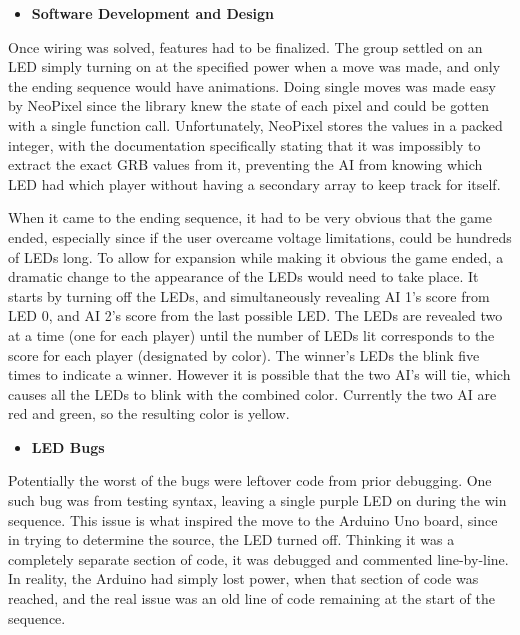 \documentclass[twoside]{article}
\begin{document}
\begin{itemize}
    \item\textbf{Software Development and Design}
\end{itemize}
\text Once wiring was solved, features had to be finalized. The group settled on an LED simply turning on at the specified power when a move was made, and only the ending sequence would have animations. Doing single moves was made easy by NeoPixel since the library knew the state of each pixel and could be gotten with a single function call. Unfortunately, NeoPixel stores the values in a packed integer, with the documentation specifically stating that it was impossibly to extract the exact GRB values from it, preventing the AI from knowing which LED had which player without having a secondary array to keep track for itself.

When it came to the ending sequence, it had to be very obvious that the game ended, especially since if the user overcame voltage limitations, could be hundreds of LEDs long. To allow for expansion while making it obvious the game ended, a dramatic change to the appearance of the LEDs would need to take place. It starts by turning off the LEDs, and simultaneously revealing AI 1's score from LED 0, and AI 2's score from the last possible LED. The LEDs are revealed two at a time (one for each player) until the number of LEDs lit corresponds to the score for each player (designated by color). The winner's LEDs the blink five times to indicate a winner. However it is possible that the two AI's will tie, which causes all the LEDs to blink with the combined color. Currently the two AI are red and green, so the resulting color is yellow.

\begin{itemize}
    \item\textbf{LED Bugs}
\end{itemize}
\text Potentially the worst of the bugs were leftover code from prior debugging. One such bug was from testing syntax, leaving a single purple LED on during the win sequence. This issue is what inspired the move to the Arduino Uno board, since in trying to determine the source, the LED turned off. Thinking it was a completely separate section of code, it was debugged and commented line-by-line. In reality, the Arduino had simply lost power, when that section of code was reached, and the real issue was an old line of code remaining at the start of the sequence.
\end{document}
